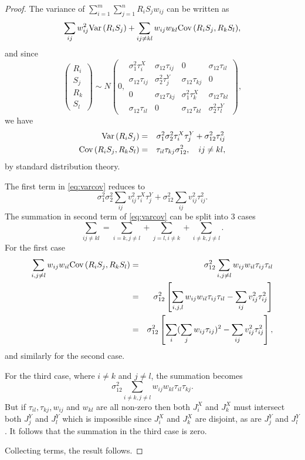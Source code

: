 \begin{proof}
The variance of $\sum_{i=1}^{m} \sum_{j=1}^{n} R_i S_j w_{ij}$ can be written as 
\begin{equation}\label{eq:varcov}
\sum_{ij} w_{ij}^2 \text{\rm Var}\,(R_i S_j) + \sum_{ij \neq kl}w_{ij} w_{kl} \text{\rm Cov}\,(R_i S_j,R_k S_l),\end{equation}
and since
$$\left(\begin{array}{l} R_i\\S_j\\R_k\\S_l \end{array}\right) \sim N \left(0,\begin{array}{cccc}
\sigma^2_1 \tau_i^X & \sigma_{12} \tau_{ij} & 0 & \sigma_{12} \tau_{il} \\
\sigma_{12} \tau_{ij} & \sigma^2_2 \tau^Y_j & \sigma_{12} \tau_{kj} &0  \\
0 & \sigma_{12}\tau_{kj} & \sigma^2_1 \tau^X_{k} & \sigma_{12} \tau_{kl} \\
\sigma_{12} \tau_{il} & 0 & \sigma_{12} \tau_{kl} & \sigma^2_2 \tau^Y_l \end{array}
\right),
$$
we have 
\begin{eqnarray*}
\text{\rm Var}\,(R_i S_j) &=& \sigma^2_1 \sigma^2_2 \tau_i^X \tau_j^Y + \sigma_{12}^2 \tau^2_{ij} \\
\text{\rm Cov}\,(R_i S_j, R_k S_l) &=& \tau_{il} \tau_{kj} \sigma^2_{12}, \quad ij \neq kl, 
\end{eqnarray*}
by standard distribution theory.

The first term in \eqref{eq:varcov}  reduces to 
$$ \sigma_1^2 \sigma_2^2 \sum_{ij} v^2_{ij} \tau_i^X \tau_j^Y + \sigma^2_{12}  \sum_{ij} v^2_{ij} \tau^2_{ij}.$$ 
The summation in second term of \eqref{eq:varcov} can be split into 3 cases
$$
\sum_{ij \neq kl} = \sum_{i=k,j \neq l} + \sum_{j=l,i \neq k} + \sum_{i \neq k, j \neq l}. $$
For the first case%
\begin{eqnarray*}
\sum_{i,j \neq l} w_{ij} w_{il} \text{\rm Cov}\,(R_i S_j,R_k S_l) &=& \sigma^2_{12}\sum_{i,j \neq l} w_{ij} w_{il} \tau_{ij} \tau_{il} \\
& =&
\sigma^2_{12}\left[\sum_{i,j,l} w_{ij} w_{il} \tau_{ij} \tau_{il} - \sum_{ij} v^2_{ij} \tau^2_{ij}\right]\\
&=& 
\sigma^2_{12}\left[\sum_i(\sum_j w_{ij} \tau_{ij})^2  - \sum_{ij} v^2_{ij} \tau^2_{ij}\right],
\end{eqnarray*}
and similarly for the second case. 

For the third case, where $i \neq k$ and $j \neq l$, the summation becomes 
$$ 
\sigma^2_{12} \sum_{i \neq k, j \neq l} w_{ij} w_{kl} \tau_{il} \tau_{kj}.$$
But if $\tau_{il},\tau_{kj},w_{ij}$ and $w_{kl}$ are all non-zero then both $J^X_i$ and $J^X_k$ must intersect both $J^Y_j$ and $J^Y_l$ which is impossible since $J^X_i$ and $J^X_k$ are disjoint, as are $J^Y_j$ and $J^Y_l$. It follows that the summation in the third case is zero.

Collecting terms, the result follows.
\end{proof}

